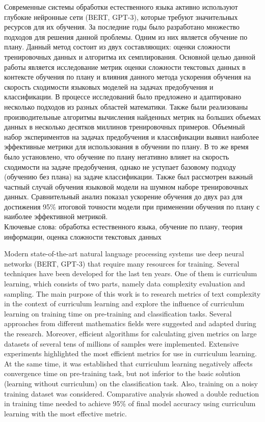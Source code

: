 \documentclass{spbau-diploma}
\begin{document}
Современные системы обработки естественного языка активно используют глубокие нейронные сети (BERT, GPT-3), которые требуют значительных ресурсов для их обучения. За последние годы было разработано множество подходов для решения данной проблемы. Одним из них является обучение по плану. Данный метод состоит из двух составляющих: оценки сложности тренировочных данных и алгоритма их семплирования. Основной целью данной работы является исследование метрик оценки сложности текстовых данных в контексте обучения по плану и влияния данного метода ускорения обучения на скорость сходимости языковых моделей на задачах предобучения и классификации. В процессе исследований было предложено и адаптировано несколько подходов из разных областей математики. Также были реализованы производительные алгоритмы вычисления найденных метрик на больших объемах данных в несколько десятков миллинов тренировочных примеров. Объемный набор экспериментов на задачах предобучения и классификации  выявил наиболее эффективные метрики для использования в обучении по плану. В то же время было установлено, что обучение по плану негативно влияет на скорость сходимости на задаче предобучения, однако не уступает базовому подходу (обучению без плана) на задаче классификации. Также был рассмотрен важный частный случай обучения языковой модели на шумном наборе тренировочных данных. Сравнительный анализ показал ускорение обучения до двух раз для достижения 95\% итоговой точности модели при применении обучения по плану с наиболее эффективной метрикой.
\\

Ключевые слова: обработка естественного языка, обучение по плану, теория информации, оценка сложности текстовых данных

\pagebreak

Modern state-of-the-art natural language processing systems use deep neural networks (BERT, GPT-3) that require many resources for training. Several techniques have been developed for the last ten years. One of them is curriculum learning, which consists of two parts, namely data complexity evaluation and sampling. The main purpose of this work is to research metrics of text complexity in the context of curriculum learning and explore the influence of curriculum learning on training time on pre-training and classification tasks. Several approaches from different mathematics fields were suggested and adapted during the research. Moreover, efficient algorithms for calculating given metrics on large datasets of several tens of millions of samples were implemented. Extensive experiments highlighted the most efficient metrics for use in curriculum learning. At the same time, it was established that curriculum learning negatively affects convergence time on pre-training task, but not inferior to the basic solution (learning without curriculum) on the classification task. Also, training on a noisy training dataset was considered. Comparative analysis showed a double reduction in training time needed to achieve 95\% of final model accuracy using curriculum learning with the most effective metric.
\end{document}
